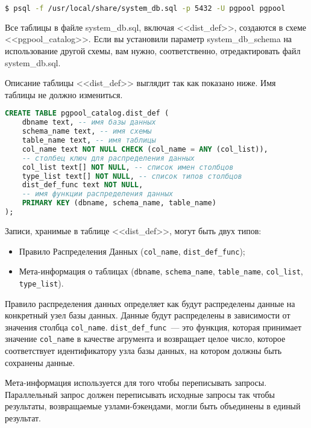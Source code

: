\begin{lstlisting}[language=Bash,label=lst:pgpool30,caption=Создание таблицы dist\_def]
$ psql -f /usr/local/share/system_db.sql -p 5432 -U pgpool pgpool
\end{lstlisting}

Все таблицы в файле system\_db.sql, включая <<dist\_def>>, создаются в схеме <<pgpool\_catalog>>. Если вы установили параметр system\_db\_schema на использование другой схемы, вам нужно, соответственно, отредактировать файл system\_db.sql.

Описание таблицы <<dist\_def>> выглядит так как показано ниже. Имя таблицы не должно измениться.

\begin{lstlisting}[language=SQL,label=lst:pgpool31,caption=Создание таблицы dist\_def]
CREATE TABLE pgpool_catalog.dist_def (
    dbname text, -- имя базы данных
    schema_name text, -- имя схемы
    table_name text, -- имя таблицы
    col_name text NOT NULL CHECK (col_name = ANY (col_list)),
    -- столбец ключ для распределения данных
    col_list text[] NOT NULL, -- список имен столбцов
    type_list text[] NOT NULL, -- список типов столбцов
    dist_def_func text NOT NULL,
    -- имя функции распределения данных
    PRIMARY KEY (dbname, schema_name, table_name)
);
\end{lstlisting}

Записи, хранимые в таблице <<dist\_def>>, могут быть двух типов:

\begin{itemize}
  \item Правило Распределения Данных (\lstinline!col_name!, \lstinline!dist_def_func!);
  \item Мета-информация о таблицах (\lstinline!dbname!, \lstinline!schema_name!, \lstinline!table_name!, \lstinline!col_list!, \lstinline!type_list!).
\end{itemize}

Правило распределения данных определяет как будут распределены данные на конкретный узел базы данных. Данные будут распределены в зависимости от значения столбца \lstinline!col_name!. \lstinline!dist_def_func!~--- это функция, которая принимает значение \lstinline!col_name! в качестве агрумента и возвращает целое число, которое соответствует идентификатору узла базы данных, на котором должны быть сохранены данные.

Мета-информация используется для того чтобы переписывать запросы. Параллельный запрос должен переписывать исходные запросы так чтобы результаты, возвращаемые узлами-бэкендами, могли быть объединены в единый результат.


